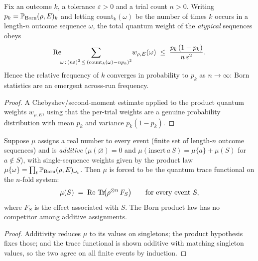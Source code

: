 \begin{theorem}
  \label{thm:quantum-chebyshev}
  \leanok
  Fix an outcome $k$, a tolerance $\varepsilon>0$ and a trial count $n>0$. Writing
  $p_k = \mathbb{P}_{\mathrm{Born}}(\rho,E)_k$ and letting $\mathrm{count}_k(\omega)$ be the number of
  times $k$ occurs in a length-$n$ outcome sequence $\omega$, the total quantum
  weight of the \emph{atypical} sequences obeys
  \[
    \operatorname{Re} \!\!\sum_{\substack{\omega \,:\, (n\varepsilon)^2 \,\le\,
        (\mathrm{count}_k(\omega) - n p_k)^2}}
    \! w_{\rho,E}(\omega)
    \;\le\; \frac{p_k\,(1-p_k)}{n\,\varepsilon^{2}} .
  \]
  Hence the relative frequency of $k$ converges in probability to $p_k$ as
  $n \to \infty$: Born statistics are an emergent across-run frequency.
\end{theorem}

\begin{proof}
  \leanok
  A Chebyshev/second-moment estimate applied to the product quantum weights
  $w_{\rho,E}$, using that the per-trial weights are a genuine probability
  distribution with mean $p_k$ and variance $p_k(1-p_k)$.
\end{proof}

\begin{theorem}
  \label{thm:born-unique}
  \leanok
  Suppose $\mu$ assigns a real number to every event (finite set of length-$n$
  outcome sequences) and is \emph{additive} ($\mu(\varnothing)=0$ and
  $\mu(\mathrm{insert}\,a\,S)=\mu\{a\}+\mu(S)$ for $a\notin S$), with single-sequence
  weights given by the product law
  $\mu\{\omega\} = \prod_{t} \mathbb{P}_{\mathrm{Born}}(\rho,E)_{\omega_t}$. Then $\mu$ is forced to be the
  quantum trace functional on the $n$-fold system:
  \[
    \mu(S) \;=\; \operatorname{Re} \,\operatorname{Tr}\!\bigl( \rho^{\otimes n}\, F_S \bigr)
    \qquad\text{for every event } S,
  \]
  where $F_S$ is the effect associated with $S$. The Born product law has no
  competitor among additive assignments.
\end{theorem}

\begin{proof}
  \leanok
  Additivity reduces $\mu$ to its values on singletons; the product hypothesis fixes
  those; and the trace functional is shown additive with matching singleton values,
  so the two agree on all finite events by induction.
\end{proof}


